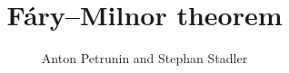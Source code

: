 \documentclass[twoside]{article}
\begin{document}
\title{F\'ary--Milnor theorem}
\author{Anton Petrunin and Stephan Stadler}

\date{}
\maketitle












\sloppy
\printbibliography[heading=bibintoc]
\fussy
\end{document}
